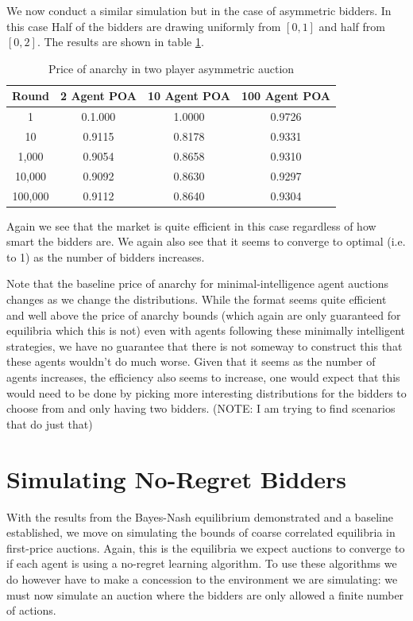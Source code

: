 \documentclass[12pt,twoside]{reedthesis}
\begin{document}
We now conduct a similar simulation but in the case of asymmetric bidders. In this case Half of the bidders are drawing uniformly from $[0,1]$ and half from $[0,2]$. The results are shown in table \ref{table:zero_int_asymmetric}. 

\begin{table}[h!]
	\begin{center}
		\begin{tabular}{ |c|c|c|c| }
			\hline
			Round & 2 Agent POA & 10 Agent POA & 100 Agent POA \\
			\hline
			1 & 0.1.000 & 1.0000 & 0.9726\\
			10 & 0.9115 & 0.8178 & 0.9331\\
			1,000 & 0.9054 & 0.8658 & 0.9310\\
			10,000 & 0.9092 & 0.8630 & 0.9297\\
			100,000 & 0.9112 & 0.8640 & 0.9304\\
			\hline
		\end{tabular}
		\caption{Price of anarchy in two player asymmetric auction}
		\label{table:zero_int_asymmetric}
	\end{center} 
\end{table}

Again we see that the market is quite efficient in this case regardless of how smart the bidders are. We again also see that it seems to converge to optimal (i.e. to 1) as the number of bidders increases.

Note that the baseline price of anarchy for minimal-intelligence agent auctions changes as we change the distributions. While the format seems quite efficient and well above the price of anarchy bounds (which again are only guaranteed for equilibria which this is not) even with agents following these minimally intelligent strategies, we have no guarantee that there is not someway to construct this that these agents wouldn't do much worse. Given that it seems as the number of agents increases, the efficiency also seems to increase, one would expect that this would need to be done by picking more interesting distributions for the bidders to choose from and only having two bidders. (NOTE: I am trying to find scenarios that do just that)

\section{Simulating No-Regret Bidders}
With the results from the Bayes-Nash equilibrium demonstrated and a baseline established, we move on simulating the bounds of coarse correlated equilibria in first-price auctions. Again, this is the equilibria we expect auctions to converge to if each agent is using a no-regret learning algorithm. To use these algorithms we do however have to make a concession to the environment we are simulating: we must now simulate an auction where the bidders are only allowed a finite number of actions.
\end{document}
